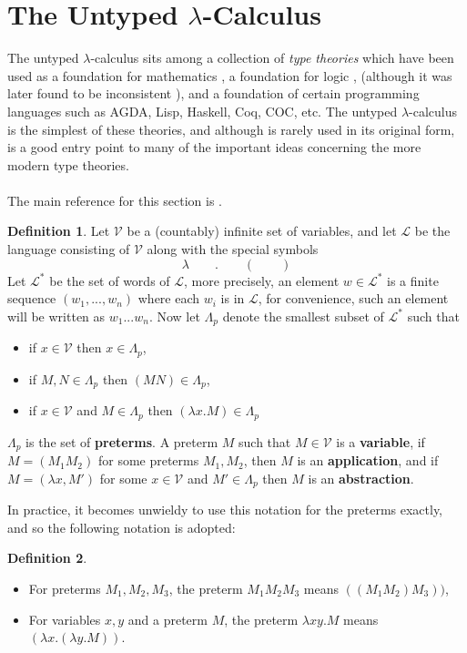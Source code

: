 \documentclass[12pt]{article}
\theoremstyle{plane}
\theoremstyle{definition}
\newtheorem{defn}{Definition}
\newcommand{\scr}[1]{\mathscr{#1}}
\begin{document}
	\section{The Untyped $\lambda$-Calculus}
	The untyped $\lambda$-calculus sits among a collection of \emph{type theories} which have been used as a foundation for mathematics \cite{lambekscott}, a foundation for logic \cite{ChurchOne}, (although it was later found to be inconsistent \cite{ChurchTwo}), and a foundation of certain programming languages such as AGDA, Lisp, Haskell, Coq, COC, etc. The untyped $\lambda$-calculus is the simplest of these theories, and although is rarely used in its original form, is a good entry point to many of the important ideas concerning the more modern type theories.\\\\
	The main reference for this section is \cite[\S3.3]{SU}.
	\begin{defn}
		\label{lambdacalc}
		Let $\scr{V}$ be a (countably) infinite set of variables, and let $\scr{L}$ be the language consisting of $\scr{V}$ along with the special symbols 
		\[\lambda \qquad . \qquad ( \qquad )\]
		Let $\scr{L}^\ast$ be the set of words of $\scr{L}$, more precisely, an element $w \in \scr{L}^\ast$ is a finite sequence $(w_1,...,w_n)$ where each $w_i$ is in $\scr{L}$, for convenience, such an element will be written as $w_1...w_n$. Now let $\Lambda_p$ denote the smallest subset of $\scr{L}^\ast$ such that
		\begin{itemize}
			\item if $x \in \scr{V}$ then $x \in \Lambda_p$,
			\item if $M,N \in \Lambda_p$ then $(MN) \in \Lambda_p$,
			\item if $x \in \scr{V}$ and $M \in \Lambda_p$ then $(\lambda x. M) \in \Lambda_p$
		\end{itemize}
		$\Lambda_p$ is the set of \textbf{preterms}. A preterm $M$ such that $M \in \scr{V}$ is a \textbf{variable}, if $M = (M_1M_2)$ for some preterms $M_1,M_2$, then $M$ is an \textbf{application}, and if $M = (\lambda x, M')$ for some $x \in \scr{V}$ and $M' \in \Lambda_p$ then $M$ is an \textbf{abstraction}.
	\end{defn}
	In practice, it becomes unwieldy to use this notation for the preterms exactly, and so the following notation is adopted:
	\begin{defn}
		\begin{itemize}
			\item For preterms $M_1,M_2,M_3$, the preterm $M_1M_2M_3$ means $((M_1M_2)M_3))$,
			\item For variables $x,y$ and a preterm $M$, the preterm $\lambda xy. M$ means $(\lambda x. (\lambda y. M))$.
		\end{itemize}
	\end{defn}
\end{document}
